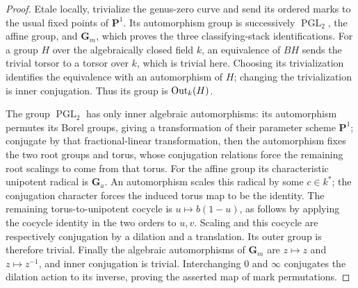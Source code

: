 \begin{proof}
Etale locally, trivialize the genus-zero curve and send its
ordered marks to the usual fixed points of $\mathbf P^1$.
Its automorphism group is successively
$\operatorname{PGL}_2$, the affine group, and $\mathbf G_m$,
which proves the three classifying-stack identifications.
For a group $H$ over the algebraically closed field $k$,
an equivalence of $BH$ sends the trivial torsor to a
torsor over $k$, which is trivial here.  Choosing its
trivialization identifies the equivalence with an
automorphism of $H$; changing the trivialization is inner
conjugation.  Thus its group is $\operatorname{Out}_k(H)$.

The group $\operatorname{PGL}_2$ has only inner algebraic
automorphisms: its automorphism permutes its Borel groups,
giving a transformation of their parameter scheme
$\mathbf P^1$; conjugate by that fractional-linear
transformation, then the automorphism fixes the two root
groups and torus, whose conjugation relations force the
remaining root scalings to come from that torus.
For the affine group its characteristic unipotent radical
is $\mathbf G_a$.  An automorphism scales this radical by
some $c\in k^*$; the conjugation character forces the
induced torus map to be the identity.  The remaining
torus-to-unipotent cocycle is $u\mapsto b(1-u)$, as follows
by applying the cocycle identity in the two orders to
$u,v$.  Scaling and this cocycle are respectively
conjugation by a dilation and a translation.  Its outer
group is therefore trivial.  Finally the algebraic
automorphisms of $\mathbf G_m$ are $z\mapsto z$ and
$z\mapsto z^{-1}$, and inner conjugation is trivial.
Interchanging $0$ and $\infty$ conjugates the dilation
action to its inverse, proving the asserted map of
mark permutations.
\end{proof}
